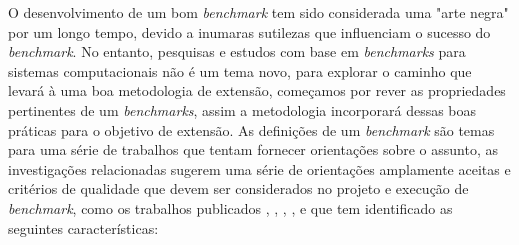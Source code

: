 O desenvolvimento de um bom \textit{benchmark} tem sido considerada uma "arte negra" por um longo tempo, devido a inumaras sutilezas que influenciam o sucesso do \textit{benchmark}. 
No entanto, pesquisas e estudos com base em \textit{benchmarks} para sistemas computacionais não é um tema novo, para explorar o caminho que levará à uma boa metodologia de extensão, começamos por rever as propriedades pertinentes de um \textit{benchmarks}, assim a metodologia incorporará dessas boas práticas para o objetivo de extensão.
As definições de um \textit{benchmark} são temas para uma série de trabalhos que tentam fornecer orientações sobre o assunto, as investigações relacionadas sugerem uma série de orientações amplamente aceitas e critérios de qualidade que devem ser considerados no projeto e execução de \textit{benchmark}, como os trabalhos publicados , , , ,  e  que tem identificado as seguintes características:


